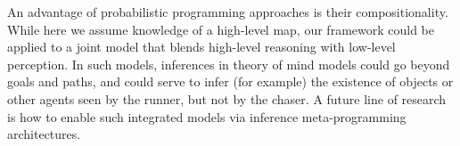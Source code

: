 \documentclass{article}
\begin{document}
An advantage of probabilistic programming approaches is their compositionality.  While
here we assume knowledge of a high-level map, our framework could be
applied to a joint model that blends high-level reasoning with
low-level perception.  In such models, inferences in theory of
mind models could go beyond goals and paths, and could serve to
infer (for example) the existence of objects or other agents seen by
the runner, but not by the chaser. A future line of research is how to enable such integrated models via inference meta-programming architectures.













\end{document}
